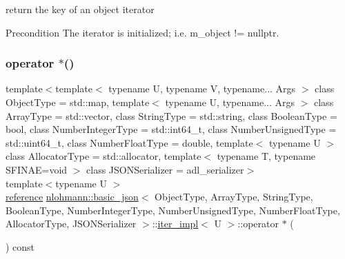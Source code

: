 return the key of an object iterator 

\begin{DoxyPrecond}{Precondition}
The iterator is initialized; i.\+e. {\ttfamily m\+\_\+object != nullptr}. 
\end{DoxyPrecond}
\mbox{\label{classnlohmann_1_1basic__json_1_1iter__impl_a2850071895be7a875acaee50a19129cc}} 
\subsubsection{\texorpdfstring{operator $\ast$()}{operator *()}}
{\footnotesize\ttfamily template$<$template$<$ typename U, typename V, typename... Args $>$ class Object\+Type = std\+::map, template$<$ typename U, typename... Args $>$ class Array\+Type = std\+::vector, class String\+Type  = std\+::string, class Boolean\+Type  = bool, class Number\+Integer\+Type  = std\+::int64\+\_\+t, class Number\+Unsigned\+Type  = std\+::uint64\+\_\+t, class Number\+Float\+Type  = double, template$<$ typename U $>$ class Allocator\+Type = std\+::allocator, template$<$ typename T, typename S\+F\+I\+N\+A\+E=void $>$ class J\+S\+O\+N\+Serializer = adl\+\_\+serializer$>$ \\
template$<$typename U $>$ \\
\mbox{\hyperlink{classnlohmann_1_1basic__json_1_1iter__impl_ae09599e9cb4a947020a0265c0c4f3d5e}{reference}} \mbox{\hyperlink{classnlohmann_1_1basic__json}{nlohmann\+::basic\+\_\+json}}$<$ Object\+Type, Array\+Type, String\+Type, Boolean\+Type, Number\+Integer\+Type, Number\+Unsigned\+Type, Number\+Float\+Type, Allocator\+Type, J\+S\+O\+N\+Serializer $>$\+::\mbox{\hyperlink{classnlohmann_1_1basic__json_1_1iter__impl}{iter\+\_\+impl}}$<$ U $>$\+::operator $\ast$ (\begin{DoxyParamCaption}{ }\end{DoxyParamCaption}) const\hspace{0.3cm}{\ttfamily [inline]}}



